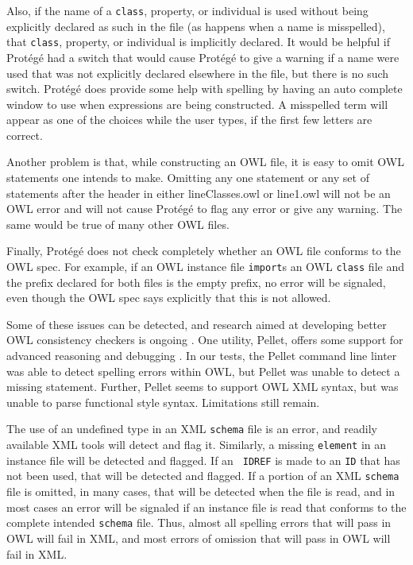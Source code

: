 \documentclass[preprint,12pt]{elsarticle}
\begin{document}
Also, if the name of a {\tt class}, property, or individual is used without
being explicitly declared as such in the file (as happens when a name is
misspelled), that {\tt class}, property, or individual is implicitly
declared. It would be helpful if Prot\'eg\'e had a switch that would cause
Prot\'eg\'e to give a warning if a name were used that was not explicitly
declared elsewhere in the file, but there is no such switch. Prot\'eg\'e
does provide some help with spelling by having an auto complete window to
use when expressions are being constructed. A misspelled term will appear
as one of the choices while the user types, if the first few letters are
correct.

Another problem is that, while constructing an OWL file, it is easy to omit
OWL statements one intends to make. Omitting any one statement or any set
of statements after the header in either lineClasses.owl or line1.owl will
not be an OWL error and will not cause Prot\'eg\'e to flag any error or
give any warning. The same would be true of many other OWL files.

Finally, Prot\'eg\'e does not check completely whether an OWL file conforms
to the OWL spec. For example, if an OWL instance file {\tt import}s an OWL
{\tt class} file and the prefix declared for both files is the empty
prefix, no error will be signaled, even though the OWL spec says explicitly
that this is not allowed.

Some of these issues can be detected, and research aimed at developing
better OWL consistency checkers is ongoing \cite{owlIntegrity,moreOwlIntegrity}. One utility, Pellet, offers some support
for advanced reasoning and debugging \cite{pellet}. In our tests,
the Pellet command line linter was able to detect spelling errors
within OWL, but Pellet was unable to detect a missing statement.
Further, Pellet seems to support OWL XML syntax, but was unable to
parse functional style syntax. Limitations still remain.

The use of an undefined type in an XML {\tt schema} file is an error, and
readily available XML tools will detect and flag it. Similarly, a missing
{\tt element} in an instance file will be detected and flagged. If an {\tt
  IDREF} is made to an {\tt ID} that has not been used, that will be
detected and flagged. If a portion of an XML {\tt schema} file is omitted,
in many cases, that will be detected when the file is read, and in most
cases an error will be signaled if an instance file is read that conforms
to the complete intended {\tt schema} file. Thus, almost all spelling
errors that will pass in OWL will fail in XML, and most errors of omission
that will pass in OWL will fail in XML.
\end{document}
